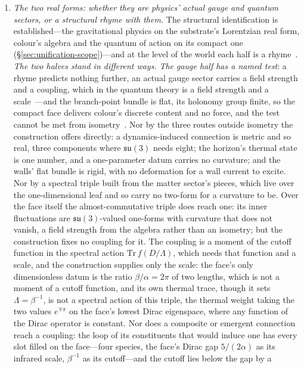 \documentclass[11pt,a4paper]{article}
\theoremstyle{plain}
\theoremstyle{definition}
\theoremstyle{remark}
\newcommand{\su}{\mathfrak{su}}
\begin{document}
\begin{enumerate}
\item\label{frontier:realforms} \emph{The two real forms: whether they are physics' actual gauge and quantum sectors, or a structural rhyme with them.}  The structural identification is established---the gravitational physics on the substrate's Lorentzian real form, colour's algebra and the quantum of action on its compact one (\S\ref{sec:unification-scope})---and at the level of the world each half is a rhyme~\cite{JanzenBoundary}.  \emph{The two halves stand in different ways.}  \emph{The gauge half has a named test}: a rhyme predicts nothing further, an actual gauge sector carries a field strength and a coupling, which in the quantum theory is a field strength and a scale~\cite{JanzenMatter}---and the branch-point bundle is flat, its holonomy group finite, so the compact face delivers colour's discrete content and no force, and the test cannot be met from isometry~\cite{JanzenBoundary,JanzenMatter}. Nor by the three routes outside isometry the construction offers directly: a dynamics-induced connection is metric and so real, three components where $\su(3)$ needs eight; the horizon's thermal state is one number, and a one-parameter datum carries no curvature; and the walls' flat bundle is rigid, with no deformation for a wall current to excite. Nor by a spectral triple built from the matter sector's pieces, which live over the one-dimensional leaf and so carry no two-form for a curvature to be. Over the face itself the almost-commutative triple does reach one: its inner fluctuations are $\su(3)$-valued one-forms with curvature that does not vanish, a field strength from the algebra rather than an isometry; but the construction fixes no coupling for it. The coupling is a moment of the cutoff function in the spectral action $\mathrm{Tr}\,f(D/\Lambda)$, which needs that function and a scale, and the construction supplies only the scale: the face's only dimensionless datum is the ratio $\beta/\alpha=2\pi$ of two lengths, which is not a moment of a cutoff function, and its own thermal trace, though it sets $\Lambda=\beta^{-1}$, is not a spectral action of this triple, the thermal weight taking the two values $e^{\mp\pi}$ on the face's lowest Dirac eigenspace, where any function of the Dirac operator is constant. Nor does a composite or emergent connection reach a coupling: the loop of its constituents that would induce one has every slot filled on the face---four species, the face's Dirac gap $5/(2\alpha)$ as its infrared scale, $\beta^{-1}$ as its cutoff---and the cutoff lies below the gap by a 
\end{enumerate}
\end{document}
